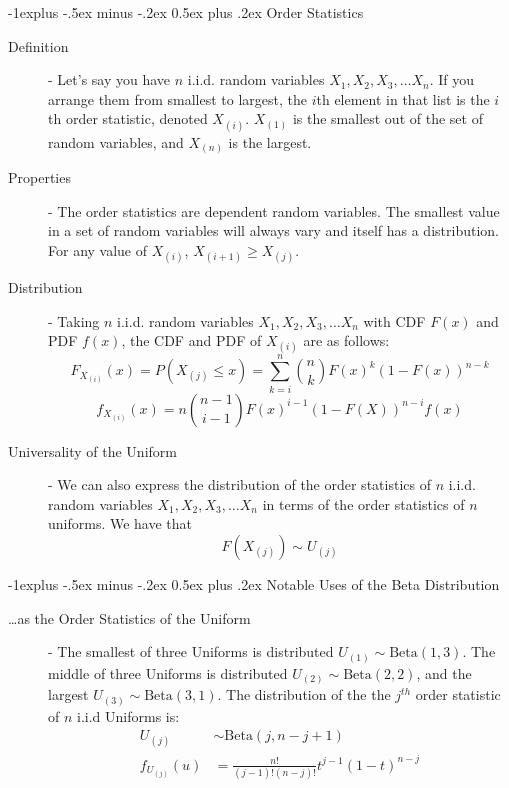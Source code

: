 \documentclass[10pt,landscape]{article}
\makeatletter
\theoremstyle{definition}
\newcommand{\Beta}{\textrm{Beta}}
\renewcommand{\subsection}{\@startsection{subsection}{2}{0mm}%
                                {-1explus -.5ex minus -.2ex}%
                                {0.5ex plus .2ex}%
                                {\normalfont\normalsize\bfseries}}
\makeatother
\begin{document}
\begin{multicols}{3}
\subsection{Order Statistics}
\begin{description}
    \item[Definition] - Let's say you have $n$ i.i.d. random variables $X_1, X_2, X_3, \dots X_n$. If you arrange them from smallest to largest, the $i$th element in that list is the $i$th order statistic, denoted $X_{(i)}$. $X_{(1)}$ is the smallest out of the set of random variables, and $X_{(n)}$ is the largest.
    \item[Properties] - The order statistics are dependent random variables. The smallest value in a set of random variables will always vary and itself has a distribution. For any value of $X_{(i)}$, $X_{(i+1)} \geq X_{(j)}$.
    \item[Distribution] - Taking $n$ i.i.d. random variables $X_1, X_2, X_3, \dots X_n$ with CDF $F(x)$ and PDF $f(x)$, the CDF and PDF of $X_{(i)}$ are as follows:
    \[F_{X_{(i)}}(x) = P (X_{(j)} \leq x) = \sum_{k=i}^n {n \choose k} F(x)^k(1 - F(x))^{n - k}\]
    \[f_{X_{(i)}}(x) = n{n - 1 \choose i - 1}F(x)^{i-1}(1 - F(X))^{n-i}f(x)\]
    \item[Universality of the Uniform] - We can also express the distribution of the order statistics of $n$  i.i.d. random variables $X_1, X_2, X_3, \dots X_n$ in terms of the order statistics of $n$ uniforms. We have that
    \[F(X_{(j)}) \sim U_{(j)}\]
\end{description}


\subsection{Notable Uses of the Beta Distribution}
\begin{description}
    \item[\dots as the Order Statistics of the Uniform] -  The smallest of three Uniforms is distributed $U_{(1)} \sim \Beta(1, 3)$. The middle of three Uniforms is distributed $U_{(2)} \sim \Beta(2, 2)$, and the largest $U_{(3)} \sim \Beta(3, 1)$. The distribution of the the $j^{th}$ order statistic of $n$ i.i.d Uniforms is:
    \begin{align*}
        U_{(j)} &\sim \Beta(j, n - j + 1) \\
        f_{U_{(j)}}(u) &= \frac{n!}{(j-1)!(n-j)!}t^{j-1}(1-t)^{n-j}
    \end{align*}
    

\end{description}
\end{multicols}
\end{document}
